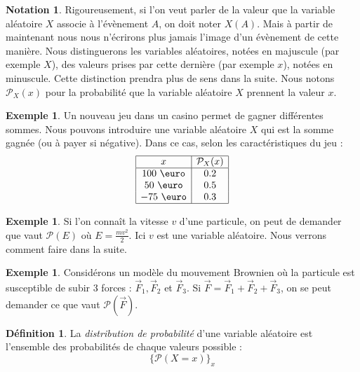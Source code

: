 \documentclass[a4paper,12pt]{report}
\theoremstyle{definition}
\renewcommand{\(}{\left(}
\renewcommand{\)}{\right)}
\renewcommand{\P}{\mathcal{P}}
\renewcommand{\t}{\text}
\renewcommand{\d}{\textit}
\newtheorem{defn}[thm]{Définition}
\newtheorem{exmp}[thm]{Exemple}
\newtheorem{notat}[thm]{Notation}
\begin{document}
    \begin{notat}
            Rigoureusement, si l'on veut parler de la valeur que la variable aléatoire $X$ associe à l'évènement $A$, on doit noter $X(A)$. Mais à partir de maintenant nous nous n'écrirons plus jamais l'image d'un évènement de cette manière. Nous distinguerons les variables aléatoires, notées en majuscule (par exemple $X$), des valeurs prises par cette dernière (par exemple $x$), notées en minuscule. Cette distinction prendra plus de sens dans la suite. Nous notons $\P_X(x)$ pour la probabilité que la variable aléatoire $X$ prennent la valeur $x$.
        \end{notat}
    
    \begin{exmp}
        Un nouveau jeu dans un casino permet de gagner différentes sommes. Nous pouvons introduire une variable aléatoire $X$ qui est la somme gagnée (ou à payer si négative). Dans ce cas, selon les caractéristiques du jeu :
        $$
        \begin{array}{|c|c|}
            \hline
            x & \P_X(x) \\
            \hline
            100~\t{\euro} & 0.2 \\
            50~\t{\euro} & 0.5 \\
            -75~\t{\euro} & 0.3 \\
            \hline
        \end{array}
        $$
    \end{exmp}
    
    \begin{exmp}
        Si l'on connaît la vitesse $v$ d'une particule, on peut de demander que vaut $\P(E)$ où $E = \frac{mv^2}{2}$. Ici $v$ est une variable aléatoire. Nous verrons comment faire dans la suite.
    \end{exmp}
    
    \begin{exmp}
        Considérons un modèle du mouvement Brownien où la particule est susceptible de subir 3 forces : $\overrightarrow{F}_1, \overrightarrow{F}_2$ et $\overrightarrow{F}_3$. Si $\overrightarrow{F} = \overrightarrow{F}_1 + \overrightarrow{F}_2 + \overrightarrow{F}_3$, on se peut demander ce que vaut $\P(\overrightarrow{F})$.
    \end{exmp}
    
        \begin{leftbar}
            \begin{defn}
                La \d{distribution de probabilité} d'une variable aléatoire est l'ensemble des probabilités de chaque valeurs possible :
                $$\{ \P(X =x) \}_x$$
            \end{defn}
        \end{leftbar}
        
\end{document}
